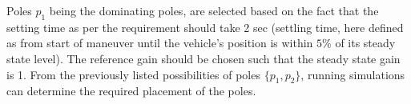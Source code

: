 Poles $p_1$ being the dominating poles, are selected based on the fact that the setting time as per the requirement should take 2 sec (settling time, here defined as from start of maneuver until the vehicle's position is within $5\%$ of its steady state level). The reference gain should be chosen such that the steady state gain is 1. From the previously listed possibilities of poles $\{p_1, p_2\}$, running simulations can determine the required placement of the poles.







